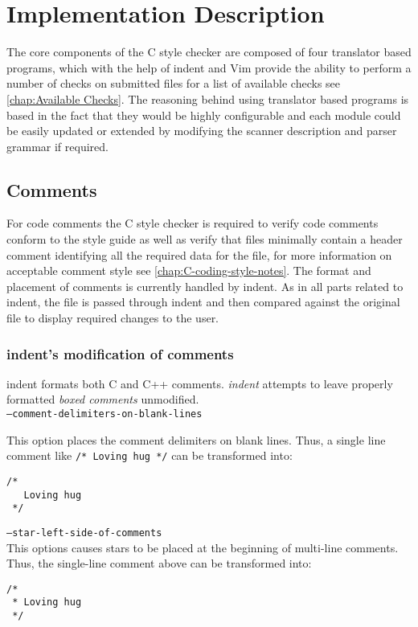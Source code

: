 \chapter{Implementation Description}
\label{chap:IMPLEMENT}

The core components of the C style checker are composed of four translator 
based programs, which with the help of indent and Vim provide the 
ability to perform a number of checks on submitted files for a list of 
available checks see \autoref{chap:Available Checks}. The reasoning behind 
using translator based programs is based in the fact that they would be highly 
configurable and each module could be easily updated or extended by modifying 
the scanner description and parser grammar if required. 

\section{Comments}

For code comments the C style checker is required to verify code comments 
conform to the style guide as well as verify that files minimally contain a 
header comment identifying all the required data for the file, for more 
information on acceptable comment style see 
\autoref{chap:C-coding-style-notes}. The format and placement of comments is
currently handled by indent. As in all parts related to indent, the file is 
passed through indent and then compared against the original file to display 
required changes to the user. 

\subsection{indent's modification of comments}

indent formats both C and C++ comments. \emph{indent} attempts to leave 
properly formatted \emph{boxed comments} unmodified.\\

\texttt{--comment-delimiters-on-blank-lines}
    
\noindent This option places the comment delimiters on blank lines.
Thus, a single line comment like \verb|/* Loving hug */| can be
transformed into:
\begin{verbatim}
/*
   Loving hug
 */
\end{verbatim}

\texttt{--star-left-side-of-comments} \\
\noindent This options causes stars to be placed at the beginning of multi-line
comments. Thus, the single-line comment above can be transformed into:
\begin{verbatim}
/*
 * Loving hug
 */
\end{verbatim}

